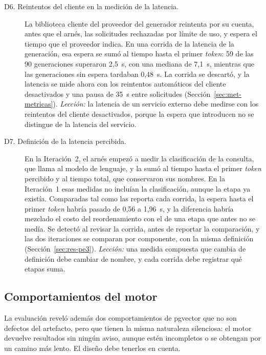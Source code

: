 \begin{description}
    \item[D6. Reintentos del cliente en la medición de la latencia.] La biblioteca cliente del proveedor del generador reintenta por su cuenta, antes que el arnés, las solicitudes rechazadas por límite de uso, y espera el tiempo que el proveedor indica. En una corrida de la latencia de la generación, esa espera se sumó al tiempo hasta el primer \textit{token}: 59 de las 90 generaciones superaron 2,5~s, con una mediana de 7,1~s, mientras que las generaciones sin espera tardaban 0,48~s. La corrida se descartó, y la latencia se mide ahora con los reintentos automáticos del cliente desactivados y una pausa de 35~s entre solicitudes (Sección~\ref{sec:met-metricas}). \emph{Lección:} la latencia de un servicio externo debe medirse con los reintentos del cliente desactivados, porque la espera que introducen no se distingue de la latencia del servicio.
    \item[D7. Definición de la latencia percibida.] En la Iteración~2, el arnés empezó a medir la clasificación de la consulta, que llama al modelo de lenguaje, y la sumó al tiempo hasta el primer \textit{token} percibido y al tiempo total, que conservaron sus nombres. En la Iteración~1 esas medidas no incluían la clasificación, aunque la etapa ya existía. Comparadas tal como las reporta cada corrida, la espera hasta el primer \textit{token} habría pasado de 0,56 a 1,96~s, y la diferencia habría mezclado el costo del reordenamiento con el de una etapa que antes no se medía. Se detectó al revisar la corrida, antes de reportar la comparación, y las dos iteraciones se comparan por componente, con la misma definición (Sección~\ref{sec:res-pe3}). \emph{Lección:} una medida compuesta que cambia de definición debe cambiar de nombre, y cada corrida debe registrar qué etapas suma.
\end{description}

\subsection{Comportamientos del motor}
\label{sec:res-motor}

La evaluación reveló además dos comportamientos de pgvector que no son defectos del artefacto, pero que tienen la misma naturaleza silenciosa: el motor devuelve resultados sin ningún aviso, aunque estén incompletos o se obtengan por un camino más lento. El diseño debe tenerlos en cuenta.

